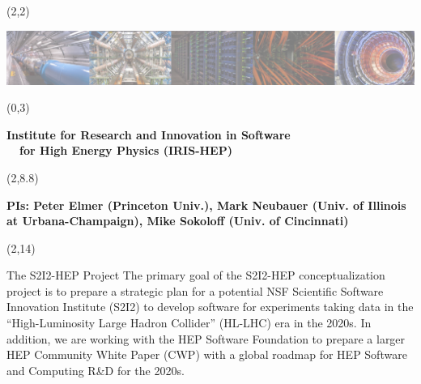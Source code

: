 \documentclass[final]{beamer}
\begin{document}
\begin{frame}{} 


\begin{textblock}{80.0}(2,2)
\begin{center}
\includegraphics[width=1.00\textwidth]{images/s2i2-banner-50percent.png}
\end{center}
\end{textblock}

\begin{textblock}{84.0}(0,3)
\begin{center}
\begin{Huge}
\textbf{
Institute for Research and Innovation in Software\\
~~for High Energy Physics (IRIS-HEP)
}
\end{Huge}
\end{center}
\end{textblock}

\begin{textblock}{84.0}(2,8.8)
\begin{center}
\begin{Large}
\textbf{
PIs: Peter Elmer (Princeton Univ.), Mark Neubauer (Univ. of Illinois \\ 
at Urbana-Champaign), Mike Sokoloff (Univ. of Cincinnati)
}
\end{Large}
\end{center}
\end{textblock}

\begin{textblock}{80.0}(2,14)
\begin{block}{The S2I2-HEP Project}
The primary goal of the S2I2-HEP conceptualization project is to
prepare a strategic plan for a potential NSF Scientific Software
Innovation Institute (S2I2) to develop software for experiments
taking data in the ``High-Luminosity Large Hadron Collider'' (HL-LHC)
era in the 2020s. In addition, we are working with the HEP Software
Foundation to prepare a larger HEP Community White Paper (CWP)
with a global roadmap for HEP Software and Computing R\&D for
the 2020s. 
\end{block}
\end{textblock}


\end{frame}
\end{document}
